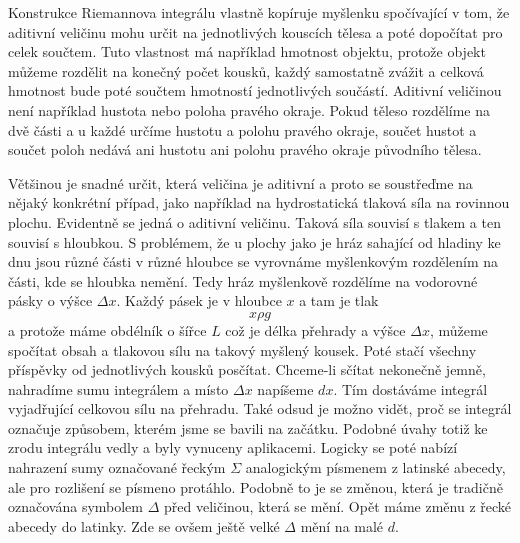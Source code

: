 \documentclass[12pt]{article}
\begin{document}
Konstrukce Riemannova integrálu vlastně kopíruje myšlenku spočívající v tom, že aditivní veličinu mohu určit na jednotlivých kouscích tělesa a poté dopočítat pro celek součtem. Tuto vlastnost má například hmotnost objektu, protože objekt můžeme rozdělit na konečný počet kousků, každý samostatně zvážit a celková hmotnost bude poté součtem hmotností jednotlivých součástí. Aditivní veličinou není například hustota nebo poloha pravého okraje. Pokud těleso rozdělíme na dvě části a u každé určíme hustotu a polohu pravého okraje, součet hustot a součet poloh nedává ani hustotu ani polohu pravého okraje původního tělesa.

Většinou je snadné určit, která veličina je aditivní a proto se soustřeďme na nějaký konkrétní případ, jako například na hydrostatická tlaková síla na rovinnou plochu. Evidentně se jedná o aditivní veličinu. Taková síla souvisí s tlakem a ten souvisí s hloubkou. S problémem, že u plochy jako je hráz sahající od hladiny ke dnu jsou různé části v různé hloubce se vyrovnáme myšlenkovým rozdělením na části, kde se hloubka nemění. Tedy hráz myšlenkově rozdělíme na vodorovné pásky o výšce $ \Delta x$. Každý pásek je v hloubce $x$ a tam je tlak $$x\rho g$$ a protože máme obdélník o šířce $L$ což je délka přehrady a výšce $\Delta x$, můžeme spočítat obsah a tlakovou sílu na takový myšlený kousek. Poté stačí všechny příspěvky od jednotlivých kousků posčítat. Chceme-li sčítat nekonečně jemně, nahradíme sumu integrálem a místo $\Delta x$ napíšeme $dx$. Tím dostáváme integrál vyjadřující celkovou sílu na přehradu. Také odsud je možno vidět, proč se integrál označuje způsobem, kterém jsme se bavili na začátku. Podobné úvahy totiž ke zrodu integrálu vedly a byly vynuceny aplikacemi. Logicky se poté nabízí nahrazení sumy označované řeckým $\Sigma$ analogickým písmenem z latinské abecedy, ale pro rozlišení se písmeno protáhlo. Podobně to je se změnou, která je tradičně označována symbolem $\Delta$ před veličinou, která se mění. Opět máme změnu z řecké abecedy do latinky. Zde se ovšem ještě velké $\Delta$ mění na malé $d$.
\end{document}
